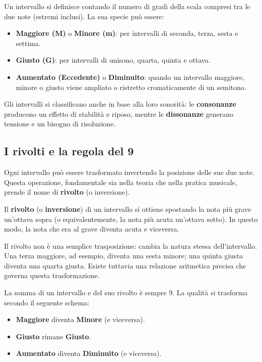 \begin{definizione}
	\label{def:intervalli}
	Un intervallo si definisce contando il numero di gradi della scala compresi tra le due note (estremi inclusi). La sua specie può essere:
	\begin{itemize}
		\item \textbf{Maggiore (M)} o \textbf{Minore (m)}: per intervalli di seconda, terza, sesta e settima.
		\item \textbf{Giusto (G)}: per intervalli di unisono, quarta, quinta e ottava.
		\item \textbf{Aumentato (Eccedente)} o \textbf{Diminuito}: quando un intervallo maggiore, minore o giusto viene ampliato o ristretto cromaticamente di un semitono.
	\end{itemize}
\end{definizione}

Gli intervalli si classificano anche in base alla loro sonorità: le \textbf{consonanze} producono un effetto di stabilità e riposo, mentre le \textbf{dissonanze} generano tensione e un bisogno di risoluzione.

\subsection{I rivolti e la regola del 9}

Ogni intervallo può essere trasformato invertendo la posizione delle sue due note. Questa operazione, fondamentale sia nella teoria che nella pratica musicale, prende il nome di \textbf{rivolto} (o inversione).

\begin{definizione}
	\label{def:rivolto_intervallo}
	Il \textbf{rivolto} (o \textbf{inversione}) di un intervallo si ottiene spostando la nota più grave un'ottava sopra (o equivalentemente, la nota più acuta un'ottava sotto). In questo modo, la nota che era al grave diventa acuta e viceversa.
\end{definizione}

Il rivolto non è una semplice trasposizione: cambia la natura stessa dell'intervallo. Una terza maggiore, ad esempio, diventa una sesta minore; una quinta giusta diventa una quarta giusta. Esiste tuttavia una relazione aritmetica precisa che governa questa trasformazione.

\begin{regola}
	\label{reg:regola_del_9}
	La somma di un intervallo e del suo rivolto è sempre 9. La qualità si trasforma secondo il seguente schema:
	\begin{itemize}
		\item \textbf{Maggiore} diventa \textbf{Minore} (e viceversa).
		\item \textbf{Giusto} rimane \textbf{Giusto}.
		\item \textbf{Aumentato} diventa \textbf{Diminuito} (e viceversa).
	\end{itemize}
\end{regola}

